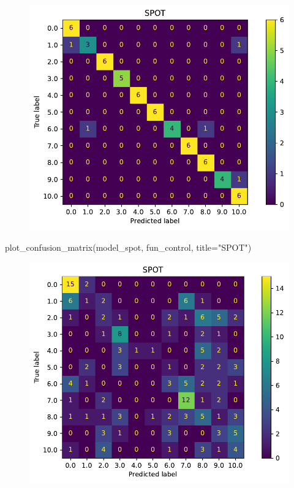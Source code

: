 \documentclass[
  letterpaper,
  DIV=11,
  numbers=noendperiod]{scrreprt}
\newenvironment{Shaded}{\begin{snugshade}}{\end{snugshade}}
\newcommand{\NormalTok}[1]{\textcolor[rgb]{0.00,0.23,0.31}{#1}}
\newcommand{\OperatorTok}[1]{\textcolor[rgb]{0.37,0.37,0.37}{#1}}
\newcommand{\StringTok}[1]{\textcolor[rgb]{0.13,0.47,0.30}{#1}}
\begin{document}
\begin{figure}[H]

{\centering \includegraphics{16_spot_hpt_sklearn_multiclass_classification_randomforest_files/figure-pdf/cell-43-output-1.pdf}

}

\end{figure}

\begin{Shaded}
\begin{Highlighting}[]
\NormalTok{plot\_confusion\_matrix(model\_spot, fun\_control, title}\OperatorTok{=}\StringTok{"SPOT"}\NormalTok{)}
\end{Highlighting}
\end{Shaded}

\begin{figure}[H]

{\centering \includegraphics{16_spot_hpt_sklearn_multiclass_classification_randomforest_files/figure-pdf/cell-44-output-1.pdf}

}

\end{figure}
\end{document}
